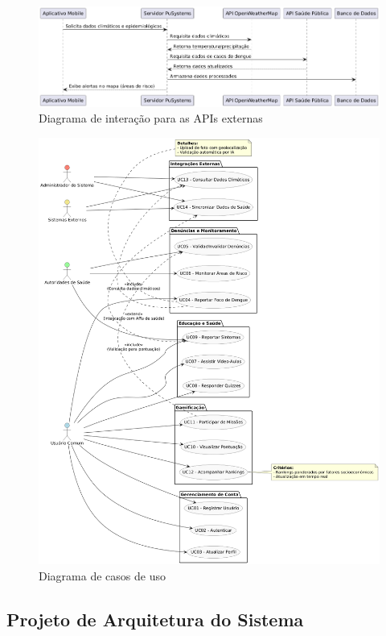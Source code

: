 \documentclass[a4paper, 12pt]{article}
\begin{document}
\begin{figure}[H]
    \centering
    \includegraphics[width=1\textwidth]{dist/Integração com APIs externas.png}
    \caption{Diagrama de interação para as APIs externas}
    \label{fig:arquitetura}
\end{figure}

\begin{figure}[H]
    \centering
    \includegraphics[width=1\textwidth]{dist/Diagrama de casos de uso.png}
    \caption{Diagrama de casos de uso}
    \label{fig:arquitetura}
\end{figure}

\subsection{Projeto de Arquitetura do Sistema}
\end{document}
